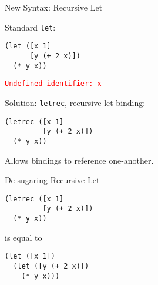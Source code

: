 \documentclass{beamer}
\begin{document}
\begin{frame}[fragile]{New Syntax: Recursive Let}

Standard \lstinline{let}:
\begin{lstlisting}
(let ([x 1]
      [y (+ 2 x)])
  (* y x))
\end{lstlisting}

\pause{} \vspace{0.25cm}

\textcolor{red}{\texttt{Undefined identifier: x}}

\pause{} \vspace{0.5cm}

Solution: \lstinline{letrec}, recursive let-binding:

\begin{lstlisting}
(letrec ([x 1]
         [y (+ 2 x)])
  (* y x))
\end{lstlisting}

Allows bindings to reference one-another.
\end{frame}

\begin{frame}[fragile]{De-sugaring Recursive Let}

\begin{lstlisting}
(letrec ([x 1]
         [y (+ 2 x)])
  (* y x))
\end{lstlisting}

\vspace{0.5cm}

is equal to

\vspace{0.5cm}

\begin{lstlisting}
(let ([x 1])
  (let ([y (+ 2 x)])
    (* y x)))
\end{lstlisting}
\end{frame}
\end{document}
